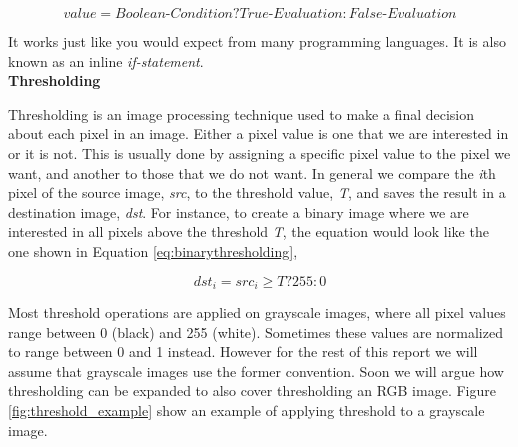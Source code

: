 \begin{equation}
value = {Boolean\mbox{-}Condition} ? {True\mbox{-}Evaluation}: {False\mbox{-}Evaluation}
\label{eq:notation}
\end{equation}

It works just like you would expect from many programming languages. It is also known as an inline \textit{if-statement}. \\

\noindent \textbf{Thresholding} \par
Thresholding is an image processing technique used to make a final decision about each pixel in an image. Either a pixel value is one that we are interested in or it is not. This is usually done by assigning a specific pixel value to the pixel we want, and another to those that we do not want. In general we compare the \textit{i}th pixel of the source image, \textit{src}, to the threshold value, \textit{T}, and saves the result in a destination image, \textit{dst}. For instance, to create a binary image where we are interested in all pixels above the threshold \textit{T}, the equation would look like the one shown in Equation \ref{eq:binarythresholding},

\begin{equation}
dst_i = src_i \geq T ? 255: 0
\label{eq:binarythresholding}
\end{equation}

Most threshold operations are applied on grayscale images, where all pixel values range between 0 (black) and 255 (white). Sometimes these values are normalized to range between 0 and 1 instead. However for the rest of this report we will assume that grayscale images use the former convention. Soon we will argue how thresholding can be expanded to also cover thresholding an RGB image. Figure \ref{fig:threshold_example} show an example of applying threshold to a grayscale image.

